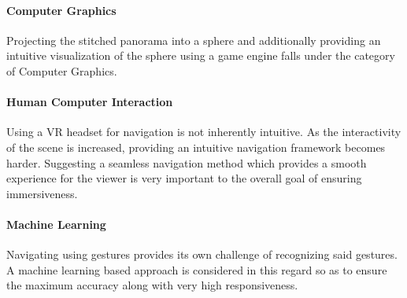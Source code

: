 \paragraph{Computer Graphics}
Projecting the stitched panorama into a sphere and additionally providing an intuitive visualization of the sphere using a game engine falls under the category of Computer Graphics.

\paragraph{Human Computer Interaction}
Using a VR headset for navigation is not inherently intuitive. As the interactivity of the scene is increased, providing an intuitive navigation framework becomes harder. Suggesting a seamless navigation method which provides a smooth experience for the viewer is very important to the overall goal of ensuring immersiveness.

\paragraph{Machine Learning}
Navigating using gestures provides its own challenge of recognizing said gestures. A machine learning based approach is considered in this regard so as to ensure the maximum accuracy along with very high responsiveness.
